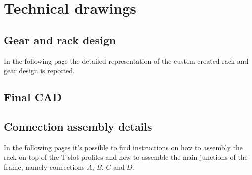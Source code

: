 \clearpage
\section{Technical drawings}
\subsection{Gear and rack design} \label{draw:gearrack}
In the following page the detailed representation of the custom created rack and gear design is reported.




\subsection{Final CAD}




\subsection{Connection assembly details}
In the following pages it's possible to find instructions on how to assembly the rack on top of the T-slot profiles and how to assemble the main junctions of the frame, namely connections $A$, $B$, $C$ and $D$.






